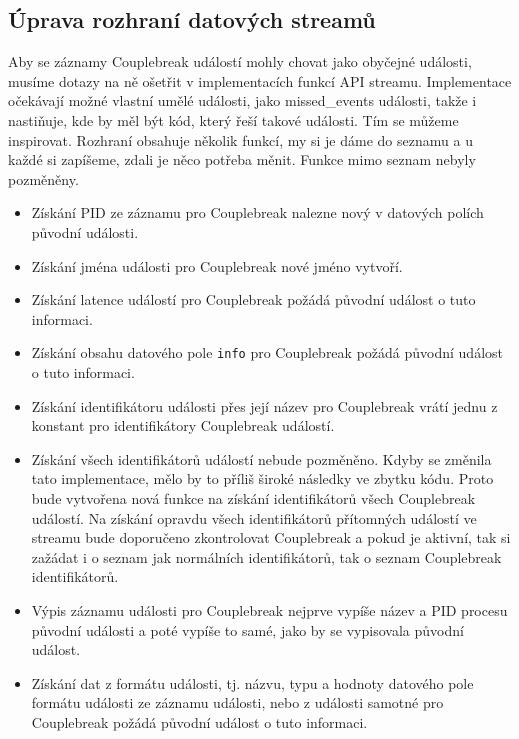 \subsection{Úprava rozhraní datových streamů}
Aby se záznamy Couplebreak událostí mohly chovat jako obyčejné události, musíme dotazy na ně ošetřit v implementacích funkcí API streamu. Implementace očekávají možné vlastní umělé události, jako missed\_events události, takže i nastiňuje, kde by měl být kód, který řeší takové události. Tím se můžeme inspirovat. Rozhraní obsahuje několik funkcí, my si je dáme do seznamu a u každé si zapíšeme, zdali je něco potřeba měnit. Funkce mimo seznam nebyly pozměněny.
\begin{itemize}
    \item Získání PID ze záznamu pro Couplebreak nalezne nový v datových polích původní události.
    \item Získání jména události pro Couplebreak nové jméno vytvoří.
    \item Získání latence událostí pro Couplebreak požádá původní událost o tuto informaci.
    \item Získání obsahu datového pole \texttt{info} pro Couplebreak požádá původní událost o tuto informaci.
    \item Získání identifikátoru události přes její název pro Couplebreak vrátí jednu z konstant pro identifikátory Couplebreak událostí.
    \item Získání všech identifikátorů událostí nebude pozměněno. Kdyby se změnila tato implementace, mělo by to příliš široké následky ve zbytku kódu. Proto bude vytvořena nová funkce na získání identifikátorů všech Couplebreak událostí. Na získání opravdu všech identifikátorů přítomných událostí ve streamu bude doporučeno zkontrolovat Couplebreak a pokud je aktivní, tak si zažádat i o seznam jak normálních identifikátorů, tak o seznam Couplebreak identifikátorů.
    \item Výpis záznamu události pro Couplebreak nejprve vypíše název a PID procesu původní události a poté vypíše to samé, jako by se vypisovala původní událost.
    \item Získání dat z formátu události, tj. názvu, typu a hodnoty datového pole formátu události ze záznamu události, nebo z události samotné pro Couplebreak požádá původní událost o tuto informaci.
\end{itemize}

